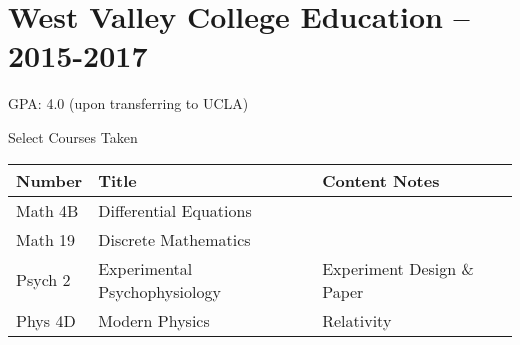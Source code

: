 \documentclass[11pt]{article}
\begin{document}
\section{West Valley College Education -- 2015-2017}

GPA: 4.0 (upon transferring to UCLA)

Select Courses Taken

\begin{tabular}{l|l|l}
Number & Title & Content Notes \\
\hline
Math 4B & Differential Equations & \\
Math 19 & Discrete Mathematics & \\
Psych 2 & Experimental Psychophysiology & Experiment Design \& Paper \\
Phys 4D & Modern Physics & Relativity \\
\end{tabular}
\end{document}
